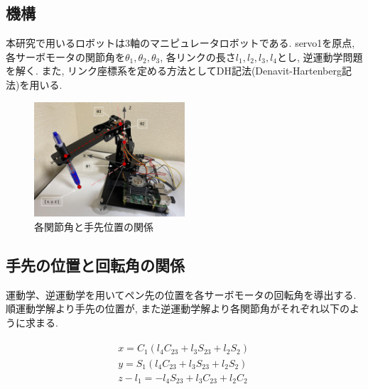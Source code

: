 \documentclass[10pt]{jarticle}
\begin{document}
	\subsection{機構}
	本研究で用いるロボットは3軸のマニピュレータロボットである.
	servo1を原点, 各サーボモータの関節角を$\theta_1, \theta_2, \theta_3$, 各リンクの長さ$l_1, l_2, l_3, l_4$とし, 逆運動学問題を解く.
	また, リンク座標系を定める方法としてDH記法(Denavit-Hartenberg記法)を用いる.

    \begin{center}
        \begin{figure}[h]
            \includegraphics[width=0.5\textwidth]{img/002.png}
            \caption{各関節角と手先位置の関係}
            \label{manipulator}
        \end{figure}
    \end{center}
    
	\subsection{手先の位置と回転角の関係}
	
	運動学、逆運動学を用いてペン先の位置を各サーボモータの回転角を導出する.
	順運動学解より手先の位置が, また逆運動学解より各関節角がそれぞれ以下のように求まる.
	
	\scriptsize
	\begin{equation}
		\begin{array}{c}
			\begin{split}
				&  x  =  C_1(l_4C_{23}  +  l_3S_{23}  +  l_2S_2)\quad \\
				&  y  =  S_1(l_4C_{23}  +  l_3S_{23}  +  l_2S_2)\quad \\
				&  z  -  l_1  =  -l_4S_{23}  +  l_3C_{23}  +  l_2C_2\quad \\
			\end{split}
		\end{array}
	\end{equation}
\end{document}
